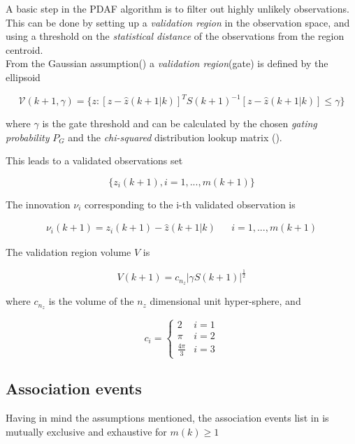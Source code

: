 A basic step in the PDAF algorithm is to filter out highly unlikely observations. This can be done by setting up a \emph{validation region} in the observation space, and using a threshold on the \emph{statistical distance} of the observations from the region centroid.\\


From the Gaussian assumption() a \emph{validation region}(gate) is defined by the ellipsoid

\begin{equation}\label{eq:validationGate}
\mathcal{V}(k+1, \gamma) = \{z: [z-\hat{z}(k+1|k)]^T S(k+1)^{-1} [z-\hat{z}(k+1|k)] \leq \gamma \}
\end{equation}



where $\gamma$ is the gate threshold and can be calculated by the chosen \emph{gating probability }$P_G$ and the \emph{chi-squared} distribution lookup matrix ().


This leads to a validated observations set

$$
\{z_i(k+1), i = 1, ..., m(k+1)\}
$$


The innovation $\nu_i$ corresponding to the i-th validated observation is

$$\begin{aligned}
\nu_i(k+1) = z_i(k+1) - \hat{z}(k+1|k)  && i= 1, ...,m(k+1)
\end{aligned}
$$


The validation region volume $V$ is

$$V(k+1) = c_{n_{z}}|\gamma S(k+1)|^\frac{1}{2}$$

where $c_{n_z}$ is the volume of the $n_z$ dimensional unit hyper-sphere, and


\begin{equation}\label{eq:ndimensionalvolume}
c_i =
\left\{\begin{array}{ll}
2  & i = 1 \\
\pi & i=2 \\
\frac{4\pi}{3} & i = 3
\end{array}
\right.
\end{equation}


\subsection{Association events}
Having in mind the assumptions mentioned, the association events list in  is mutually exclusive and exhaustive for $m(k)\geq1$

